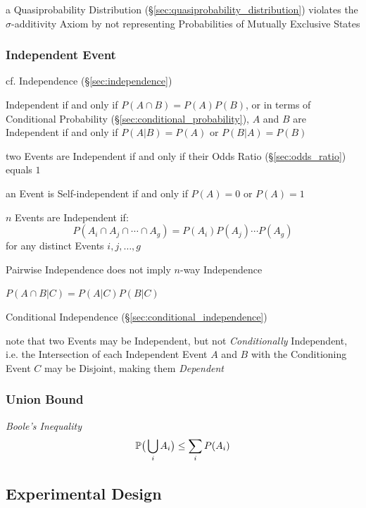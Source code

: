 a Quasiprobability Distribution (\S\ref{sec:quasiprobability_distribution})
violates the $\sigma$-additivity Axiom by not representing Probabilities of
Mutually Exclusive States



\subsubsection{Independent Event}\label{sec:independent_event}

\fist cf. Independence (\S\ref{sec:independence})

Independent if and only if $P(A \cap B) = P(A) P(B)$, or in terms of Conditional
Probability (\S\ref{sec:conditional_probability}), $A$ and $B$ are Independent
if and only if $P(A|B) = P(A)$ or $P(B|A) = P(B)$

\fist two Events are Independent if and only if their Odds Ratio
(\S\ref{sec:odds_ratio}) equals $1$

an Event is Self-independent if and only if $P(A) = 0$ or $P(A) = 1$

$n$ Events are Independent if:
\[
  P(A_i \cap A_j \cap \cdots \cap A_g) = P(A_i)P(A_j) \cdots P(A_g)
\]
for any distinct Events $i,j,\ldots,g$

Pairwise Independence does not imply $n$-way Independence

$P(A \cap B | C) = P(A|C)P(B|C)$

\fist Conditional Independence (\S\ref{sec:conditional_independence})

note that two Events may be Independent, but not \emph{Conditionally}
Independent, i.e. the Intersection of each Independent Event $A$ and $B$ with
the Conditioning Event $C$ may be Disjoint, making them \emph{Dependent}



\subsubsection{Union Bound}\label{sec:union_bound}

\emph{Boole's Inequality}
\[
  \mathbb{P}\big(\bigcup_i A_i\big) \leq \sum_i P(A_i)
\]



\subsection{Experimental Design}\label{sec:experimental_design}

